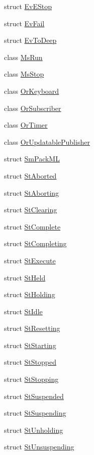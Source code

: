 \begin{DoxyCompactItemize}
\item 
struct \hyperlink{structsm__packml_1_1EvEStop}{Ev\+E\+Stop}
\item 
struct \hyperlink{structsm__packml_1_1EvFail}{Ev\+Fail}
\item 
struct \hyperlink{structsm__packml_1_1EvToDeep}{Ev\+To\+Deep}
\item 
class \hyperlink{classsm__packml_1_1MsRun}{Ms\+Run}
\item 
class \hyperlink{classsm__packml_1_1MsStop}{Ms\+Stop}
\item 
class \hyperlink{classsm__packml_1_1OrKeyboard}{Or\+Keyboard}
\item 
class \hyperlink{classsm__packml_1_1OrSubscriber}{Or\+Subscriber}
\item 
class \hyperlink{classsm__packml_1_1OrTimer}{Or\+Timer}
\item 
class \hyperlink{classsm__packml_1_1OrUpdatablePublisher}{Or\+Updatable\+Publisher}
\item 
struct \hyperlink{structsm__packml_1_1SmPackML}{Sm\+Pack\+ML}
\item 
struct \hyperlink{structsm__packml_1_1StAborted}{St\+Aborted}
\item 
struct \hyperlink{structsm__packml_1_1StAborting}{St\+Aborting}
\item 
struct \hyperlink{structsm__packml_1_1StClearing}{St\+Clearing}
\item 
struct \hyperlink{structsm__packml_1_1StComplete}{St\+Complete}
\item 
struct \hyperlink{structsm__packml_1_1StCompleting}{St\+Completing}
\item 
struct \hyperlink{structsm__packml_1_1StExecute}{St\+Execute}
\item 
struct \hyperlink{structsm__packml_1_1StHeld}{St\+Held}
\item 
struct \hyperlink{structsm__packml_1_1StHolding}{St\+Holding}
\item 
struct \hyperlink{structsm__packml_1_1StIdle}{St\+Idle}
\item 
struct \hyperlink{structsm__packml_1_1StResetting}{St\+Resetting}
\item 
struct \hyperlink{structsm__packml_1_1StStarting}{St\+Starting}
\item 
struct \hyperlink{structsm__packml_1_1StStopped}{St\+Stopped}
\item 
struct \hyperlink{structsm__packml_1_1StStopping}{St\+Stopping}
\item 
struct \hyperlink{structsm__packml_1_1StSuspended}{St\+Suspended}
\item 
struct \hyperlink{structsm__packml_1_1StSuspending}{St\+Suspending}
\item 
struct \hyperlink{structsm__packml_1_1StUnholding}{St\+Unholding}
\item 
struct \hyperlink{structsm__packml_1_1StUnsuspending}{St\+Unsuspending}
\end{DoxyCompactItemize}
